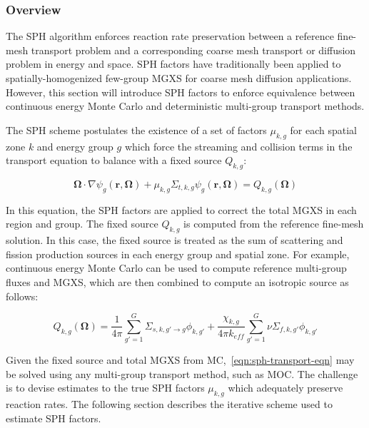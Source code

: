 \subsubsection{Overview}
\label{subsubsec:sph-overview}

The SPH algorithm enforces reaction rate preservation between a reference fine-mesh transport problem and a corresponding coarse mesh transport or diffusion problem in energy and space. SPH factors have traditionally been applied to spatially-homogenized few-group MGXS for coarse mesh diffusion applications. However, this section will introduce SPH factors to enforce equivalence between continuous energy Monte Carlo and deterministic multi-group transport methods. 

The SPH scheme postulates the existence of a set of factors $\mu_{k,g}$ for each spatial zone $k$ and energy group $g$ which force the streaming and collision terms in the transport equation to balance with a fixed source $Q_{k,g}$:

\begin{dmath}
\label{eqn:sph-transport-eqn}
\mathbf{\Omega} \cdot \nabla \psi_{g}(\mathbf{r},\mathbf{\Omega}) + \mu_{k,g}\Sigma_{t,k,g}\psi_{g}(\mathbf{r},\mathbf{\Omega}) = Q_{k,g}(\mathbf{\Omega})
\end{dmath}

\noindent In this equation, the SPH factors are applied to correct the total MGXS in each region and group. The fixed source $Q_{k,g}$ is computed from the reference fine-mesh solution. In this case, the fixed source is treated as the sum of scattering and fission production sources in each energy group and spatial zone. For example, continuous energy Monte Carlo can be used to compute reference multi-group fluxes and MGXS, which are then combined to compute an isotropic source as follows:

\begin{dmath}
\label{eqn:sph-source}
Q_{k,g}(\mathbf{\Omega}) = \frac{1}{4\pi} \sum_{g'=1}^{G} \Sigma_{s,k,g' \rightarrow g}\phi_{k,g'} + \frac{\chi_{k,g}}{4\pi k_{eff}}\sum_{g'=1}^{G} \nu\Sigma_{f,k,g'}\phi_{k,g'}
\end{dmath}

\noindent Given the fixed source and total MGXS from MC,~\autoref{eqn:sph-transport-eqn} may be solved using any multi-group transport method, such as MOC. The challenge is to devise estimates to the true SPH factors $\mu_{k,g}$ which adequately preserve reaction rates. The following section describes the iterative scheme used to estimate SPH factors.


